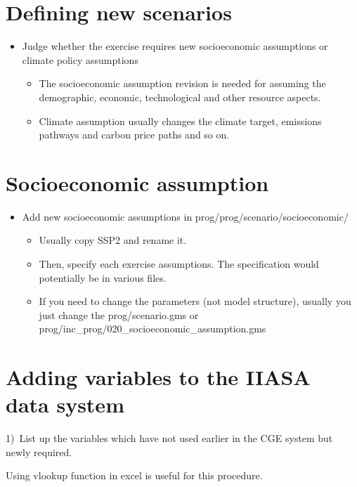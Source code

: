 \documentclass[10pt,a4paper,titlepage,dvipdfmx]{book}
\begin{document}
\begin{itemize}
\section{\label{sec:DefNewSce}Defining new scenarios}


\begin{itemize}
\item Judge whether the exercise requires new socioeconomic assumptions or climate policy assumptions
\begin{itemize}
\item The socioeconomic assumption revision is needed for assuming the demographic, economic, technological and other resource aspects.
\item Climate assumption usually changes the climate target, emissions pathways and carbon price paths and so on.
\end{itemize}

\end{itemize}
\section{\label{sec:SomeTIPS-SocAss}Socioeconomic assumption}


\begin{itemize}
\item Add new socioeconomic assumptions in prog/prog/scenario/socioeconomic/
\begin{itemize}
\item Usually copy SSP2 and rename it.
\item Then, specify each exercise assumptions. The specification would potentially be in various files.

\item If you need to change the parameters (not model structure), usually you just change the prog/scenario.gms or prog/inc\_prog/020\_socioeconomic\_assumption.gms
\end{itemize}

\end{itemize}
\section{\label{sec:AddVarIIADatSys}Adding variables to the IIASA data system}

1)~List up the variables which have not used earlier in the CGE system but newly required.\label{mark-1)}

Using vlookup function in excel is useful for this procedure.


\end{itemize}
\end{document}
